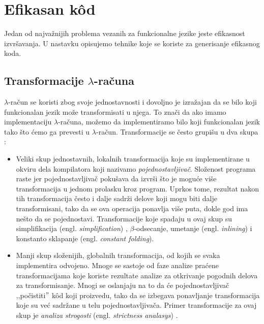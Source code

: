 \section{Efikasan k\^od}
\label{sec:efikasan kod}


Jedan od najvažnijih problema vezanih za funkcionalne jezike jeste efikasnost izvršavanja. 
U nastavku opisujemo tehnike koje se koriste za generisanje efikasnog koda.	


\subsection{Transformacije $\lambda$-računa}

$\lambda$-račun se koristi zbog svoje jednostavnosti i dovoljno je izražajan da se bilo koji funkcionalan jezik može transformisati u njega. To znači da ako imamo implementaciju $\lambda$-računa, možemo da implementiramo  bilo koji funkcionalan jezik tako što ćemo ga prevesti u $\lambda$-račun. Transformacije se često grupišu u dva skupa :


\begin{itemize}
	\item Veliki skup jednostavnih, lokalnih transformacija koje su implementirane u okviru dela kompilatora koji nazivamo \textit{pojednostavljivač}. Složenost programa raste jer pojednostavljivač pokušava da izvrši što je moguće više transformacija u jednom prolasku kroz program. Uprkos tome, rezultat nakon tih transformacija često i dalje sadrži delove koji mogu biti dalje transformisani, tako da se ova operacija ponavlja više puta, dokle god ima nešto da se pojednostavi. Transformacije koje spadaju u ovaj skup su simplifikacija (engl. \textit{simplification}) \cite{compilation-by-program-transformation}, $\beta$-odsecanje, umetanje (engl. \textit{inlining}) i konstanto sklapanje (engl. \textit{constant folding}).
	
	\item Manji skup složenijih, globalnih transformacija, od kojih se svaka implementira odvojeno. Mnoge se sastoje od faze analize praćene transformacijama koje koriste rezultate analize za otkrivanje pogodnih delova za transformisanje. Mnogi se oslanjaju na to da će pojednostavljivač ‚‚počistiti$"$ k\^ od koji proizvedu, tako da se izbegava ponavljanje transformacija koje su već sadržane u telu pojednostavljivača. Primer transformacije za ovaj skup je  \textit{analiza strogosti} (engl. \textit{strictness analasys}) \cite{haskell-by-program-transformation}. 
	
\end{itemize}
  

